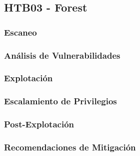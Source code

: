 \subsection{HTB03 - Forest}
\subsubsection{Escaneo}
\subsubsection{Análisis de Vulnerabilidades}
\subsubsection{Explotación}
\subsubsection{Escalamiento de Privilegios}
\subsubsection{Post-Explotación}
\subsubsection{Recomendaciones de Mitigación}